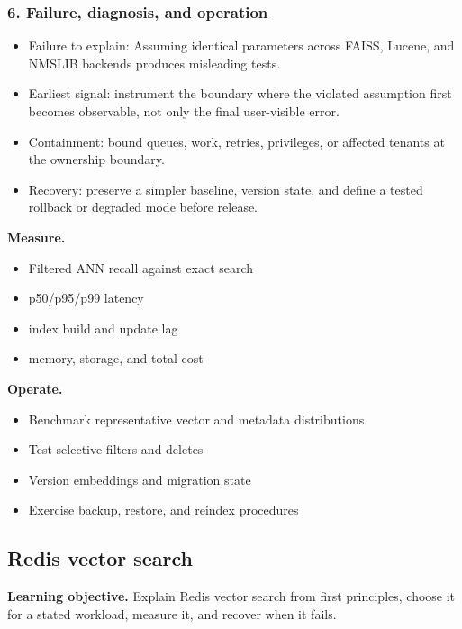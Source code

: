 \subsubsection*{6. Failure, diagnosis, and operation}
\begin{itemize}
\item Failure to explain: Assuming identical parameters across FAISS, Lucene, and NMSLIB backends produces misleading tests.
\item Earliest signal: instrument the boundary where the violated assumption first becomes observable, not only the final user-visible error.
\item Containment: bound queues, work, retries, privileges, or affected tenants at the ownership boundary.
\item Recovery: preserve a simpler baseline, version state, and define a tested rollback or degraded mode before release.
\end{itemize}
\textbf{Measure.}\begin{itemize}
\item Filtered ANN recall against exact search
\item p50/p95/p99 latency
\item index build and update lag
\item memory, storage, and total cost
\end{itemize}
\textbf{Operate.}\begin{itemize}
\item Benchmark representative vector and metadata distributions
\item Test selective filters and deletes
\item Version embeddings and migration state
\item Exercise backup, restore, and reindex procedures
\end{itemize}
\subsection{Redis vector search}
\textbf{Learning objective.} Explain Redis vector search from first principles, choose it for a stated workload, measure it, and recover when it fails.
